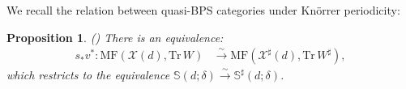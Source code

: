 \documentclass [11pt,oneside,a4paper,mathscr]{amsart}
\newtheorem{prop}[thm]{Proposition}
\theoremstyle{definition}
\newcommand{\X}{\mathscr{X}}
\begin{document}
We recall the relation 
between quasi-BPS categories under Kn\"orrer periodicity: 
\begin{prop}\label{quasiBPSprime}\emph{(\cite[Proposition~2.14]{PTquiver})}
    There is an equivalence:
    \begin{align*}
        s_*v^*\colon \mathrm{MF}(\X(d), \mathrm{Tr}\,W)&\xrightarrow{\sim} \mathrm{MF}(\X^\sharp(d), \mathrm{Tr}\,W^\sharp),
    \end{align*}
    which restricts to the equivalence 
   $\mathbb{S}(d; \delta)\xrightarrow{\sim} \mathbb{S}^\sharp(d; \delta)$.
\end{prop}
%

\end{document}
